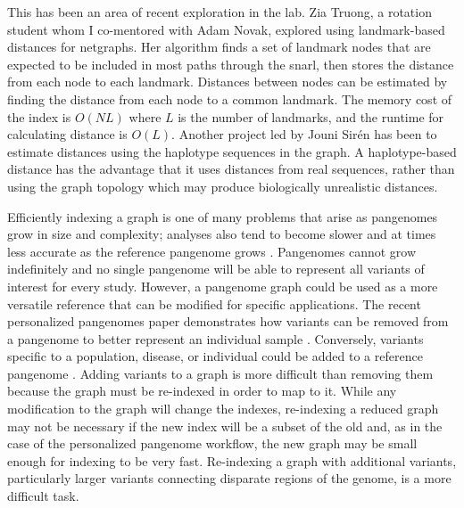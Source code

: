 \documentclass[11pt]{ucscthesis}
\begin{document}
This has been an area of recent exploration in the lab.
Zia Truong, a rotation student whom I co-mentored with Adam Novak, explored using landmark-based distances for netgraphs.
Her algorithm finds a set of landmark nodes that are expected to be included in most paths through the snarl, then stores the distance from each node to each landmark.
Distances between nodes can be estimated by finding the distance from each node to a common landmark.
The memory cost of the index is $O(NL)$ where $L$ is the number of landmarks, and the runtime for calculating distance is $O(L)$.
Another project led by Jouni Sirén has been to estimate distances using the haplotype sequences in the graph.
A haplotype-based distance has the advantage that it uses distances from real sequences, rather than using the graph topology which may produce biologically unrealistic distances.

Efficiently indexing a graph is one of many problems that arise as pangenomes grow in size and complexity; analyses also tend to become slower and at times less accurate as the reference pangenome grows \cite{Pritt2018}.
Pangenomes cannot grow indefinitely and no single pangenome will be able to represent all variants of interest for every study.
However, a pangenome graph could be used as a more versatile reference that can be modified for specific applications.
The recent personalized pangenomes paper demonstrates how variants can be removed from a pangenome to better represent an individual sample \cite{siren_personalized_2024}. 
Conversely, variants specific to a population, disease, or individual could be added to a reference pangenome \cite{denti_pangenome_2025}.
Adding variants to a graph is more difficult than removing them because the graph must be re-indexed in order to map to it.
While any modification to the graph will change the indexes, re-indexing a reduced graph may not be necessary if the new index will be a subset of the old and, as in the case of the personalized pangenome workflow, the new graph may be small enough for indexing to be very fast.
Re-indexing a graph with additional variants, particularly larger variants connecting disparate regions of the genome, is a more difficult task. 
\end{document}
